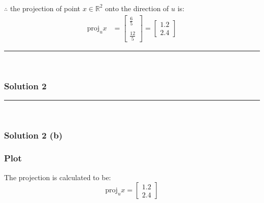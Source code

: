\documentclass{article}
\begin{document}
\subsubsection*{\normalfont}{$\therefore$ the projection of point $x \in \mathbb{R}^2$ onto the direction of $u$ is: }
\begin{align*}
    \text{proj}_u x &= \begin{bmatrix} \frac{6}{5} \\\\ \frac{12}{5} \end{bmatrix} = \begin{bmatrix} 1.2 \\ 2.4 \end{bmatrix}
\end{align*}

\noindent\rule{\textwidth}{0.4pt}\\

\newpage

\subsubsection*{Solution 2}
\noindent\rule{\textwidth}{0.4pt}\\
\subsubsection*{Solution 2 (b)}
\subsubsection*{Plot}
The projection is calculated to be:
$$\text{proj}_u x = \begin{bmatrix} 1.2 \\ 2.4 \end{bmatrix}$$
\end{document}
